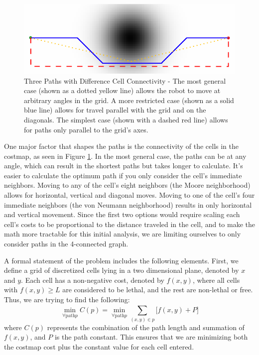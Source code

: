 \begin{figure}
\includegraphics[width=\columnwidth]{graphix/connectedness.png}
\caption{Three Paths with Difference Cell Connectivity - The most general case (shown as a dotted yellow line) allows the robot to move at arbitrary angles in the grid. A more restricted case (shown as a solid blue line) allows for travel parallel with the grid and on the diagonals. The simplest case (shown with a dashed red line) allows for paths only parallel to the grid's axes. }
\label{fig:connectedness}
\end{figure}

One major factor that shapes the paths is the connectivity of the cells in the costmap, as seen in Figure \ref{fig:connectedness}. In the most general case, the paths can be at any angle, which can result in the shortest paths but takes longer to calculate. It's easier to calculate the optimum path if you only consider the cell's immediate neighbors. Moving to any of the cell's eight neighbors (the Moore neighborhood) allows for horizontal, vertical and diagonal moves. Moving to one of the cell's four immediate neighbors (the von Neumann neighborhood) results in only horizontal and vertical movement. Since the first two options would require scaling each cell's costs to be proportional to the distance traveled in the cell, and to make the math more tractable for this initial analysis, we are limiting ourselves to only consider paths in the 4-connected graph. 

A formal statement of the problem includes the following elements. First, we define a grid of discretized cells lying in a two dimensional plane, denoted by $x$ and $y$. Each cell has a non-negative cost, denoted by $f(x,y)$, where all cells with $f(x,y)\ge L$ are considered to be lethal, and the rest are non-lethal or free. Thus, we are trying to find the following:
\begin{equation}
   \displaystyle
 \min_{\forall \mathrm{path} p} C(p) = \min_{\forall \mathrm{path} p} \sum\limits_{(x,y) \in p}^{} \Big[ f(x,y) + P \Big] 
 \end{equation}
where $C(p)$ represents the combination of the path length and summation of $f(x,y)$, and $P$ is the path constant. This ensures that we are minimizing both the costmap cost plus the constant value for each cell entered.

